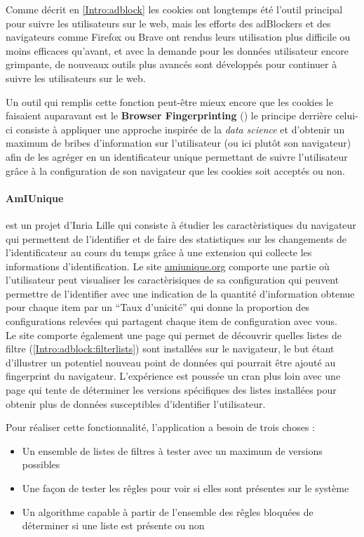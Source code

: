 \documentclass[oneside,a4paper,12pt]{article}
\begin{document}
Comme décrit en \ref{Intro:adblock} les cookies ont longtemps été l'outil principal pour suivre les utilisateurs sur le web, mais les efforts des adBlockers et des navigateurs comme Firefox ou Brave ont rendus leurs utilisation plus difficile ou moins efficaces qu'avant, et avec la demande pour les données utilisateur encore grimpante, de nouveaux outils plus avancés sont développés pour continuer à suivre les utilisateurs sur le web. 

Un outil qui remplis cette fonction peut-être mieux encore que les cookies le faisaient auparavant est le \textbf{Browser Fingerprinting} (\cite{fingerprinting}) le principe derrière celui-ci consiste à appliquer une approche inspirée de la \textit{data science} et d'obtenir un maximum de bribes d'information sur l'utilisateur (ou ici plutôt son navigateur) afin de les agréger en un identificateur unique permettant de suivre l'utilisateur grâce à la configuration de son navigateur que les cookies soit acceptés ou non.

\paragraph*{AmIUnique} est un projet d'Inria Lille qui consiste à étudier les caractèristiques du navigateur qui permettent de l'identifier et de faire des statistiques sur les changements de l'identificateur au cours du temps grâce à une extension qui collecte les informations d'identification. Le site \href{https://www.amiunique.org}{amiunique.org} comporte une partie où l'utilisateur peut visualiser les caractèrisiques de sa configuration qui peuvent permettre de l'identifier avec une indication de la quantité d'information obtenue pour chaque item par un ``Taux d'unicité'' qui donne la proportion des configurations relevées qui partagent chaque item de configuration avec vous.\\

Le site comporte également une page qui permet de découvrir quelles listes de filtre (\ref{Intro:adblock:filterlists}) sont installées sur le navigateur, le but étant d'illustrer un potentiel nouveau point de données qui pourrait être ajouté au fingerprint du navigateur. L'expérience est poussée un cran plus loin avec une page qui tente de déterminer les versions spécifiques des listes installées pour obtenir plus de données susceptibles d'identifier l'utilisateur.

Pour réaliser cette fonctionnalité, l'application a besoin de trois choses :
\begin{itemize}
	\item Un ensemble de listes de filtres à tester avec un maximum de versions possibles
	\item Une façon de tester les rêgles pour voir si elles sont présentes sur le système
	\item Un algorithme capable à partir de l'ensemble des rêgles bloquées de déterminer si une liste est présente ou non
\end{itemize}
\end{document}

